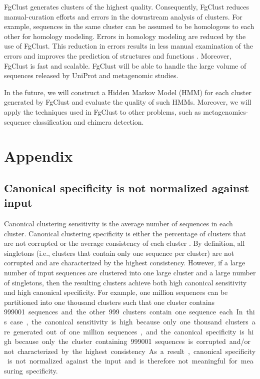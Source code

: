 \documentclass[11pt,letterpaper]{llncs2e/llncs}
\begin{document}
FgClust generates clusters of the highest quality. 
Consequently, FgClust reduces manual-curation efforts and errors in the downstream analysis of clusters.
For example, sequences in the same cluster can be assumed to be homologous to each other for homology modeling.
Errors in homology modeling are reduced by the use of FgClust.
This reduction in errors results in less manual examination of the errors and improves the prediction of structures and functions \citep{nayeem2006comparative}.
Moreover, FgClust is fast and scalable.
FgClust will be able to handle the large volume of sequences released by UniProt and metagenomic studies.

In the future, we will construct a Hidden Markov Model (HMM) for each cluster generated by FgClust and evaluate the quality of such HMMs.
Moreover, we will apply the techniques used in FgClust to other problems, such as metagenomics-sequence classification and chimera detection.%


%


\clearpage{}

\appendix

\section{Appendix}
\subsection{Canonical specificity is not normalized against input}
\label{sec:appendix:canonical-specificity}
Canonical clustering sensitivity is the average number of sequences in each cluster.
Canonical clustering specificity is either the percentage of clusters that are not corrupted \citep{hauser2013kclust} or the average consistency of each cluster \citep{hauser2016mmseqs,steinegger2017mmseqs2,steinegger2017linclust}.
By definition, all singletons (i.e., clusters that contain only one sequence per cluster) are not corrupted and are characterized by the highest consistency.
However, if a large number of input sequences are clustered into one large cluster and a large number of singletons, then the resulting clusters achieve both high canonical sensitivity and high canonical specificity.
For example, one million sequences can be partitioned into one thousand clusters such that one cluster contains \SI{999001} sequences and the other \SI{999} clusters contain one sequence each.
In this case, 
the canonical sensitivity is high because only one thousand clusters are generated out of one million sequences, 
and the canonical specificity is high because only the cluster containing \SI{999001} sequences is corrupted and/or not characterized by the highest consistency.
As a result, canonical specificity is not normalized against the input and is therefore not meaningful for measuring specificity.
\end{document}
